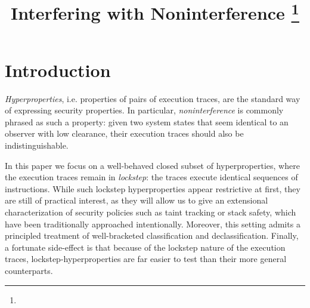 \documentclass[conference]{IEEEtran}
\begin{document}
\title{Interfering with Noninterference
\iftext\thanks{}\fi
}


\maketitle

\iftext
\begin{abstract}
\end{abstract}

\begin{IEEEkeywords}
\end{IEEEkeywords}
\fi

\iftext
\section{Introduction}

{\em Hyperproperties}, i.e. properties of pairs of execution traces,
are the standard way of expressing security properties\cn. In
particular, {\em noninterference} is commonly phrased as such a
property: given two system states that seem identical to an observer
with low clearance, their execution traces should also be
indistinguishable\cn.

In this paper we focus on a well-behaved closed subset of
hyperproperties, where the execution traces remain in {\em lockstep}:
the traces execute identical sequences of instructions. While such
lockstep hyperproperties appear restrictive at first, they are still
of practical interest, as they will allow us to give an extensional
characterization of security policies such as taint tracking or stack
safety, which have been traditionally approached
intentionally. Moreover, this setting admits a principled treatment of
well-bracketed classification and declassification. Finally, a
fortunate side-effect is that because of the lockstep nature of the
execution traces, lockstep-hyperproperties are far easier to test than
their more general counterparts.
\end{document}
